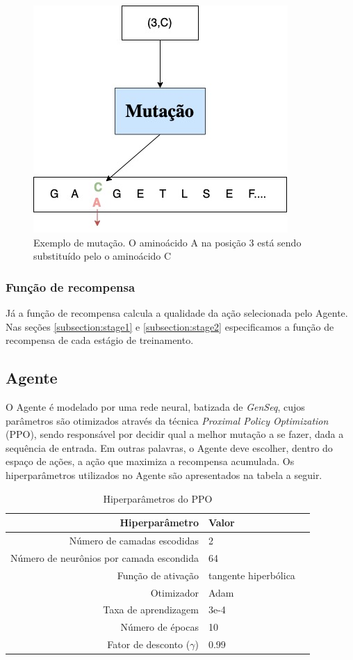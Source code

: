 \begin{figure}[H]
  \centering
  \includegraphics[width=.8\textwidth]{figuras/metodologia-Mutation.jpg}
  \caption{Exemplo de mutação. O aminoácido A na posição 3 está sendo substituído pelo o aminoácido C}
  \label{fig:mutacao}
\end{figure}

\subsubsection{Função de recompensa}
Já a função de recompensa calcula a qualidade da ação selecionada pelo Agente. 
Nas seções \ref{subsection:stage1} e \ref{subsection:stage2} especificamos a função de recompensa de cada estágio de treinamento.


\subsection{Agente}
\label{subsection:Agente}
O Agente é modelado por uma rede neural, batizada de \textit{GenSeq}, cujos parâmetros são otimizados através da técnica \textit{Proximal Policy Optimization} (PPO), 
sendo responsável por decidir qual a melhor mutação a se fazer, dada a sequência de entrada. Em outras palavras, o Agente deve escolher,
dentro do espaço de ações, a ação que maximiza a recompensa acumulada.
Os hiperparâmetros utilizados no Agente são apresentados na tabela a seguir. 

\begin{table}[H]
\centering
\vspace{0.5cm}
\begin{tabular}{r|lr}
Hiperparâmetro & Valor \\ 
\hline                               
Número de camadas escodidas & 2 \\
Número de neurônios por camada escondida & 64 \\
Função de ativação & tangente hiperbólica \\
Otimizador & Adam \\
Taxa de aprendizagem & 3e-4 \\
Número de épocas & 10 \\
Fator de desconto ($\gamma$) & 0.99 \\
\end{tabular}
\caption{Hiperparâmetros do PPO}
\end{table}

